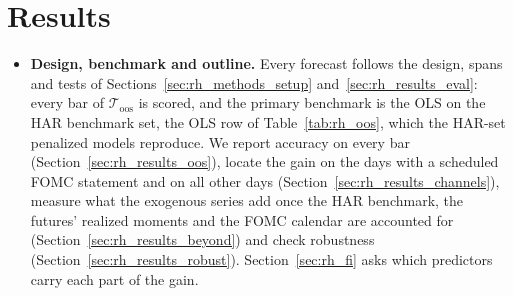 \ifdefined\rhabNClassesBeatAddRm\else\fi
\ifdefined\rhmcsNModels\else\fi
\ifdefined\rhchNEventDays\else\fi

\section{Results}
\label{sec:rh_results}
\label{sec:rh_exp_setup}
\begin{itemize}
\item \textbf{Design, benchmark and outline.} Every forecast follows the design, spans and tests of
  Sections~\ref{sec:rh_methods_setup} and~\ref{sec:rh_results_eval}: every bar of $\mathcal T_{\mathrm{oos}}$ is
  scored, and the primary benchmark is the OLS on the HAR benchmark set, the OLS row of Table~\ref{tab:rh_oos}, which
  the HAR-set penalized models reproduce. We report accuracy on every bar (Section~\ref{sec:rh_results_oos}), locate
  the gain on the days with a scheduled FOMC statement and on all other days (Section~\ref{sec:rh_results_channels}),
  measure what the exogenous series add once the HAR benchmark, the futures' realized moments and the FOMC calendar
  are accounted for (Section~\ref{sec:rh_results_beyond}) and check robustness (Section~\ref{sec:rh_results_robust}).
  Section~\ref{sec:rh_fi} asks which predictors carry each part of the gain.
\end{itemize}

